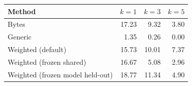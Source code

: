 \begin{tabular}{lrrr}
\toprule
Method & $k=1$ & $k=3$ & $k=5$ \\
\midrule
Bytes & 17.23 & 9.32 & 3.80 \\
Generic & 1.35 & 0.26 & 0.00 \\
Weighted (default) & 15.73 & 10.01 & 7.37 \\
Weighted (frozen shared) & 16.67 & 5.08 & 2.96 \\
Weighted (frozen model held-out) & 18.77 & 11.34 & 4.90 \\
\bottomrule
\end{tabular}

